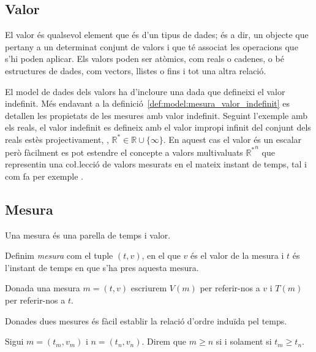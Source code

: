 \subsection{Valor}

El valor és qualsevol element que és d'un tipus de dades; és a dir, un objecte que pertany a un determinat conjunt de valors i que té associat les operacions que s'hi poden aplicar. Els valors poden ser atòmics, com reals o cadenes, o bé estructures de dades, com vectors, llistes o fins i tot una altra relació. 

El model de dades dels valors ha d'incloure una dada que defineixi el valor indefinit. Més endavant a la definició~\ref{def:model:mesura_valor_indefinit} es detallen les propietats de les mesures amb valor indefinit. Seguint l'exemple amb els reals, el valor indefinit es defineix amb el valor impropi infinit del conjunt dels reals estès projectivament, \parencite{cantrell:projectivelyextendedreal}, $\mathbb{R}^*\in\mathbb{R} \cup \{\infty\}$.  En aquest cas el valor és un escalar però fàcilment es pot estendre el concepte a valors multivaluats ${\mathbb{R}^*}^n$ que representin una co\l.lecció de valors mesurats en el mateix instant de temps, tal i com fa per exemple \textcite{assfalg08:thesis}. 





\subsection{Mesura}\label{sec:model:mesura} 

Una mesura és una parella de temps i valor.

\begin{definition}[Mesura]
  \label{def:model:mesura}
  Definim \emph{mesura} com el tuple $(t,v)$, en el que $v$ és el
  valor de la mesura i $t$ és l'instant de temps en que s'ha pres
  aquesta mesura.
\end{definition}


Donada una mesura $m=(t,v)$ escriurem $V(m)$ per referir-nos a $v$ i
$T(m)$ per referir-nos a $t$.

Donades dues mesures és fàcil establir la relació d'ordre induïda pel
temps.

\begin{definition}
  \label{def:model:mesura-relacio-ordre}
  Sigui $m=(t_m,v_m)$ i $n=(t_n,v_n)$. Direm que $m\geq n$ si i solament
  si $t_m\geq t_n$.
\end{definition}


